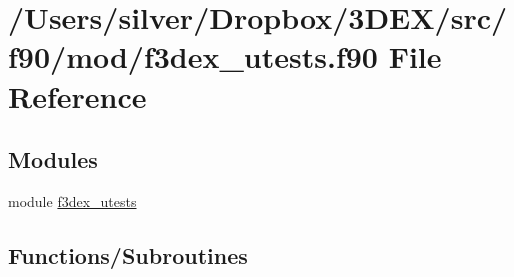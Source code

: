 \hypertarget{f3dex__utests_8f90}{
\section{/Users/silver/Dropbox/3DEX/src/f90/mod/f3dex\_\-utests.f90 File Reference}
\label{f3dex__utests_8f90}
}
\subsection*{Modules}
\begin{DoxyCompactItemize}
\item 
module \hyperlink{namespacef3dex__utests}{f3dex\_\-utests}
\end{DoxyCompactItemize}
\subsection*{Functions/Subroutines}
